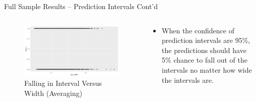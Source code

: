 \documentclass{beamer}
\begin{document}
\begin{frame}[t]{Full Sample Results -- Prediction Intervals Cont'd}
\begin{columns}[onlytextwidth]
\vspace*{-\baselineskip}
\begin{figure}
\caption{Falling in Interval Versus Width (Averaging)}
\includegraphics[scale=0.2]{ave_width_plot}
\end{figure}
\vspace*{-\baselineskip}
\begin{block}{}
\vspace*{-\baselineskip}
\begin{itemize}
\item When the confidence of prediction intervals are 95\%, the predictions should have 5\% chance to fall out of the intervals no matter how wide the intervals are.
\end{itemize}

\end{block}

\end{columns}

\end{frame}
\end{document}
